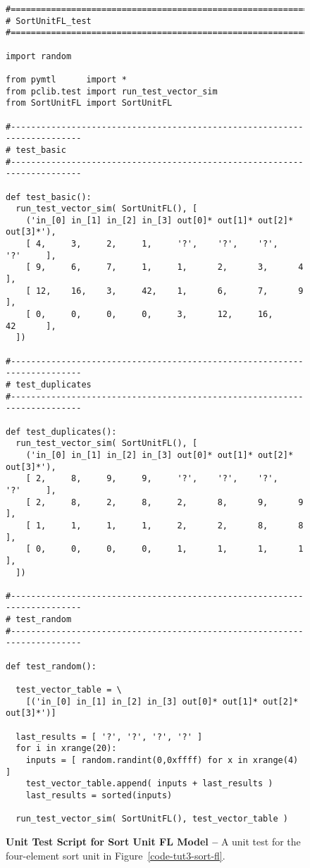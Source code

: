 
\begin{figure}

  \begin{lstlisting}[xleftmargin={0.9in}]
#=========================================================================
# SortUnitFL_test
#=========================================================================

import random

from pymtl      import *
from pclib.test import run_test_vector_sim
from SortUnitFL import SortUnitFL

#-------------------------------------------------------------------------
# test_basic
#-------------------------------------------------------------------------

def test_basic():
  run_test_vector_sim( SortUnitFL(), [
    ('in_[0] in_[1] in_[2] in_[3] out[0]* out[1]* out[2]* out[3]*'),
    [ 4,     3,     2,     1,     '?',    '?',    '?',    '?'     ],
    [ 9,     6,     7,     1,     1,      2,      3,      4       ],
    [ 12,    16,    3,     42,    1,      6,      7,      9       ],
    [ 0,     0,     0,     0,     3,      12,     16,     42      ],
  ])

#-------------------------------------------------------------------------
# test_duplicates
#-------------------------------------------------------------------------

def test_duplicates():
  run_test_vector_sim( SortUnitFL(), [
    ('in_[0] in_[1] in_[2] in_[3] out[0]* out[1]* out[2]* out[3]*'),
    [ 2,     8,     9,     9,     '?',    '?',    '?',    '?'     ],
    [ 2,     8,     2,     8,     2,      8,      9,      9       ],
    [ 1,     1,     1,     1,     2,      2,      8,      8       ],
    [ 0,     0,     0,     0,     1,      1,      1,      1       ],
  ])

#-------------------------------------------------------------------------
# test_random
#-------------------------------------------------------------------------

def test_random():

  test_vector_table = \
    [('in_[0] in_[1] in_[2] in_[3] out[0]* out[1]* out[2]* out[3]*')]

  last_results = [ '?', '?', '?', '?' ]
  for i in xrange(20):
    inputs = [ random.randint(0,0xffff) for x in xrange(4) ]
    test_vector_table.append( inputs + last_results )
    last_results = sorted(inputs)

  run_test_vector_sim( SortUnitFL(), test_vector_table )
\end{lstlisting}

  \caption{\textbf{Unit Test Script for Sort Unit FL Model --} A unit
    test for the four-element sort unit in
    Figure~\ref{code-tut3-sort-fl}.}
  \label{code-tut3-sort-fl-test}

\end{figure}

